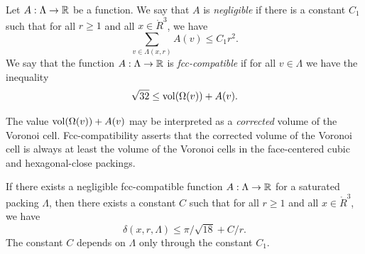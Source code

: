 \begin{definition}\label{def:negligible}
Let $A:\Lambda\to{\mathbb R}$ be a function.  We say that $A$
is
  {\it negligible\/}
if there is a constant $C_1$ such that for all $r\ge1$ and all
$x\in\ring{R}^3$, we have
   $$\sum_{v\in\Lambda(x,r)} A(v) \le C_1 r^2.$$
We say that the function $A:\Lambda\to{\mathbb R}$ is
  {\it fcc-compatible\/}
if for all $v\in\Lambda$ we have the inequality
$$\sqrt{32}\le {\operatorname{vol}}(\Omega(v)) + A(v).$$
\end{definition}

The value ${\operatorname{vol}}(\Omega(v)) + A(v)$ may be interpreted as a
{\it corrected\/} volume of the Voronoi
cell. Fcc-compatibility asserts that the corrected volume of the
Voronoi cell is always at least the volume of the Voronoi cells in
the face-centered cubic and hexagonal-close packings.




\begin{lemma}
\label{lemma:deltabound} If there exists a 
negligible  fcc-compatible function
$A:\Lambda\to{\mathbb R}$ for a saturated packing $\Lambda$, then there
exists a constant $C$ such that for all $r\ge1$ and all
$x\in\ring{R}^3$, we have
    $$
    \delta(x,r,\Lambda)
    \le \pi/\sqrt{18} + C/r.
    $$
The constant $C$ depends on $\Lambda$ only through the constant
$C_1$.
\end{lemma}



